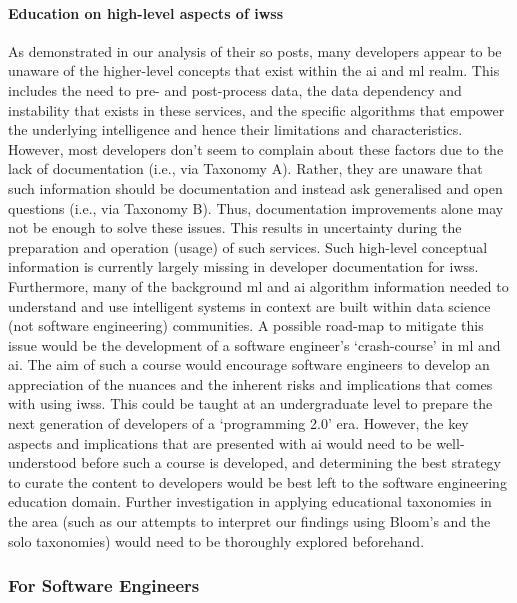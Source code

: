 \paragraph{Education on high-level aspects of \glspl{iws}} As demonstrated in our analysis of their \gls{so} posts, many developers appear to be unaware of the higher-level concepts that exist within the \gls{ai} and \gls{ml} realm. This includes the need to pre- and post-process data, the data dependency and instability that exists in these services, and the specific algorithms that empower the underlying intelligence and hence their limitations and characteristics. However, most developers don't seem to complain about these factors due to the lack of documentation (i.e., via Taxonomy A). Rather, they are unaware that such information should be documentation and instead ask generalised and open questions (i.e., via Taxonomy B). Thus, documentation improvements alone may not be enough to solve these issues. This results in uncertainty during the preparation and operation (usage) of such services.  Such high-level conceptual information is currently largely missing in developer documentation for \glspl{iws}. Furthermore, many of the background \gls{ml} and \gls{ai} algorithm information needed to understand and use intelligent systems in context are built within data science (not software engineering) communities. A possible road-map to mitigate this issue would be the development of a software engineer's `crash-course' in \gls{ml} and \gls{ai}. The aim of such a course would encourage software engineers to develop an appreciation of the nuances and the inherent risks and implications that comes with using \glspl{iws}. This could be taught at an undergraduate level to prepare the next generation of developers of a `programming 2.0' era. However, the key aspects and implications that are presented with \gls{ai} would need to be well-understood before such a course is developed, and determining the best strategy to curate the content to developers would be best left to the software engineering education domain. Further investigation in applying educational taxonomies in the area (such as our attempts to interpret our findings using Bloom's and the \gls{solo} taxonomies) would need to be thoroughly explored beforehand.

\subsubsection{For Software Engineers}

